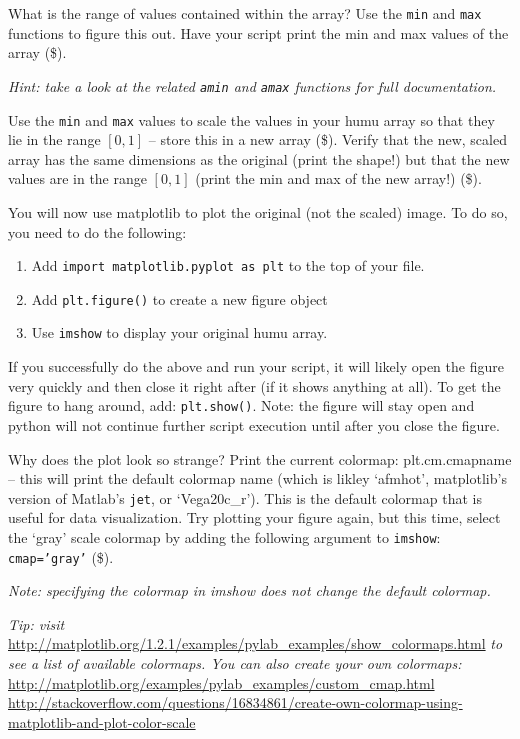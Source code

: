 \documentclass[10pt]{article}
\begin{document}
\begin{enumerate}
What is the range of values contained within the array?  Use the {\tt min} and {\tt max} functions to figure this out.  Have your script print the min and max values of the array (\$).

{\em Hint: take a look at the related {\tt amin} and {\tt amax} functions for full documentation.}

Use the {\tt min} and {\tt max} values to scale the values in your humu array so that they lie in the range $[0, 1]$ -- store this in a new array (\$).  Verify that the new, scaled array has the same dimensions as the original (print the shape!) but that the new values are in the range $[0, 1]$ (print the min and max of the new array!) (\$).

You will now use matplotlib to plot the original (not the scaled) image.  To do so, you need to do the following:
\begin{enumerate}
\item Add {\tt import matplotlib.pyplot as plt} to the top of your file.
\item Add {\tt plt.figure()} to create a new figure object
\item Use {\tt imshow} to display your original humu array.
\end{enumerate}
If you successfully do the above and run your script, it will likely open the figure very quickly and then close it right after (if it shows anything at all).  To get the figure to hang around, add: {\tt plt.show()}.  Note: the figure will stay open and python will not continue further script execution until after you close the figure.

Why does the plot look so strange?  Print the current colormap: {plt.cm.cmapname} -- this will print the default colormap name (which is likley `afmhot', matplotlib's version of Matlab's {\tt jet}, or `Vega20c\_r').  This is the default colormap that is useful for data visualization.  Try plotting your figure again, but this time, select the `gray' scale colormap by adding the following argument to {\tt imshow}: {\tt cmap='gray'} (\$).

{\em Note: specifying the colormap in imshow does not change the default colormap.}

{\em Tip: visit} \url{http://matplotlib.org/1.2.1/examples/pylab_examples/show_colormaps.html} {\em to see a list of available colormaps.  You can also create your own colormaps:}\\
\url{http://matplotlib.org/examples/pylab_examples/custom_cmap.html}\\
\url{http://stackoverflow.com/questions/16834861/create-own-colormap-using-matplotlib-and-plot-color-scale}


\end{enumerate}
\end{document}
